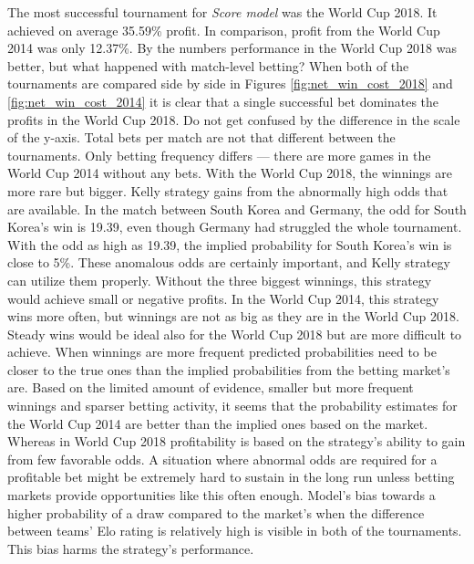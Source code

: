 The most successful tournament for \textit{Score model} was the World Cup 2018. It achieved on average 35.59\% profit. In comparison, profit from the World Cup 2014 was only 12.37\%. By the numbers performance in the World Cup 2018 was better, but what happened with match-level betting? When both of the tournaments are compared side by side in Figures \ref{fig:net_win_cost_2018} and \ref{fig:net_win_cost_2014} it is clear that a single successful bet dominates the profits in the World Cup 2018. Do not get confused by the difference in the scale of the y-axis. Total bets per match are not that different between the tournaments. Only betting frequency differs --- there are more games in the World Cup 2014 without any bets. With the World Cup 2018, the winnings are more rare but bigger. Kelly strategy gains from the abnormally high odds that are available. In the match between South Korea and Germany, the odd for South Korea's win is 19.39, even though Germany had struggled the whole tournament. With the odd as high as 19.39, the implied probability for South Korea's win is close to 5\%. These anomalous odds are certainly important, and Kelly strategy can utilize them properly. Without the three biggest winnings, this strategy would achieve small or negative profits. In the World Cup 2014, this strategy wins more often, but winnings are not as big as they are in the World Cup 2018. Steady wins would be ideal also for the World Cup 2018 but are more difficult to achieve. When winnings are more frequent predicted probabilities need to be closer to the true ones than the implied probabilities from the betting market's are. Based on the limited amount of evidence, smaller but more frequent winnings and sparser betting activity, it seems that the probability estimates for the World Cup 2014 are better than the implied ones based on the market. Whereas in World Cup 2018 profitability is based on the strategy's ability to gain from few favorable odds. A situation where abnormal odds are required for a profitable bet might be extremely hard to sustain in the long run unless betting markets provide opportunities like this often enough. Model's bias towards a higher probability of a draw compared to the market's when the difference between teams' Elo rating is relatively high is visible in both of the tournaments. This bias harms the strategy's performance.

